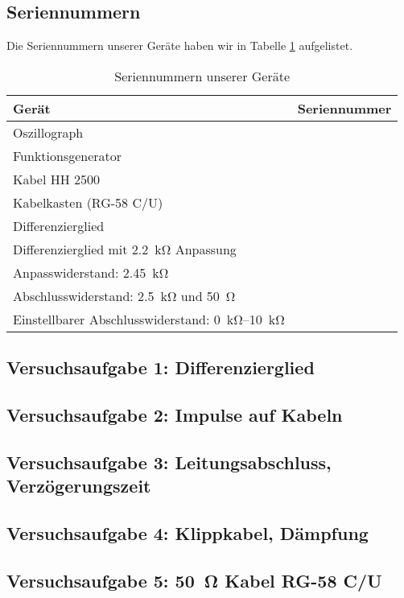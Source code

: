 \subsection{Seriennummern}

Die Seriennummern unserer Geräte haben wir in Tabelle \ref{tb:seriennummern}
aufgelistet.

\begin{table}[hb]
	\center
	\caption{Seriennummern unserer Geräte}
	\label{tb:seriennummern}
	\begin{tabular}{ll}
		Gerät & Seriennummer \\
		\hline
		Oszillograph & \\
		Funktionsgenerator & \\
		Kabel HH 2500 & \\
		Kabelkasten (RG-58 C/U) & \\
		Differenzierglied & \\
		Differenzierglied mit \SI{2.2}{\kilo\ohm} Anpassung & \\
		Anpasswiderstand: \SI{2.45}{\kilo\ohm} & \\
		Abschlusswiderstand: \SI{2.5}{\kilo\ohm} und \SI{50}{\ohm} & \\
		Einstellbarer Abschlusswiderstand: \SIrange{0}{10}{\kilo\ohm} &
	\end{tabular}
\end{table}

\subsection{Versuchsaufgabe 1: Differenzierglied}

\subsection{Versuchsaufgabe 2: Impulse auf Kabeln}

\subsection{Versuchsaufgabe 3: Leitungsabschluss, Verzögerungszeit}

\subsection{Versuchsaufgabe 4: Klippkabel, Dämpfung}

\subsection{Versuchsaufgabe 5: \SI{50}{\ohm} Kabel RG-58 C/U}

